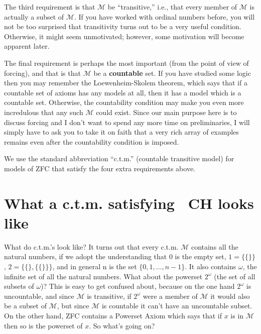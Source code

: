 \documentclass[10pt]{article}
\newcommand\axiom[1]{\textmd{#1}}
\theoremstyle{definition}
\theoremstyle{remark}
\begin{document}
The third requirement is that $\mathcal M$ be ``transitive,'' i.e., that every member of $\mathcal M$ is actually a subset of $\mathcal M$. If you have worked with ordinal numbers before, you will not be too surprised that transitivity turns out to be a very useful condition. Otherwise, it might seem unmotivated; however, some motivation will become apparent later.

The final requirement is perhaps the most important (from the point of view of forcing), and that is that $\mathcal M$ be a \textbf{countable} set. If you have studied some logic then you may remember the Loewenheim-Skolem theorem, which says that if a countable set of axioms has any models at all, then it has a model which is a countable set. Otherwise, the countability condition may make you even more incredulous that any such $\mathcal M$ could exist. Since our main purpose here is to discuss forcing and I don't want to spend any more time on preliminaries, I will simply have to ask you to take it on faith that a very rich array of examples remains even after the countability condition is imposed.

We use the standard abbreviation ``c.t.m.'' (countable transitive model) for models of \axiom{ZFC} that satisfy the four extra requirements above.


\section{What a c.t.m. satisfying \axiom{~CH} looks like}

What do c.t.m.'s look like? It turns out that every c.t.m. $\mathcal M$ contains all the natural numbers, if we adopt the understanding that 0 is the empty set, $1 = \{\{\}\}$, $2 = \{\{\}, \{\{\}\}\}$, and in general n is the set $\{0, 1, \ldots, n-1\}$. It also contains $\omega$, the infinite set of all the natural numbers. What about the powerset $2^\omega$ (the set of all subsets of $\omega$)? This is easy to get confused about, because on the one hand $2^\omega$ is uncountable, and since $\mathcal M$ is transitive, if $2^\omega$ were a member of $\mathcal M$ it would also be a subset of $\mathcal M$, but since $\mathcal M$ is countable it can't have an uncountable subset. On the other hand, \axiom{ZFC} contains a Powerset Axiom which says that if $x$ is in $\mathcal M$ then so is the powerset of $x$. So what's going on?
\end{document}
